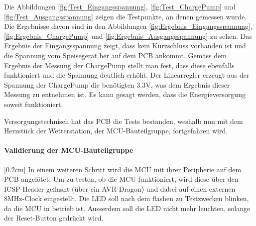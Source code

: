 Die Abbildungen \ref{fig:Test_Eingangsspannung}, \ref{fig:Test_ChargePump} und \ref{fig:Test_Ausgangsspannung} zeigen die Testpunkte, an denen gemessen wurde. Die Ergebnisse davon sind in den Abbildungen \ref{fig:Ergebnis_Eingangsspannung}, \ref{fig:Ergebnis_ChargePump} und \ref{fig:Ergebnis_Ausgangsspannung} zu sehen. Das Ergebnis der Eingangsspannung zeigt, dass kein Kurzschluss vorhanden ist und die Spannung vom Speisegerät her auf dem PCB ankommt. Gemäss dem Ergebnis der Messung der ChargePump stellt man fest, dass diese ebenfalls funktioniert und die Spannung deutlich erhöht. Der Linearregler erzeugt aus der Spannung der ChargePump die benötigten 3.3V, was dem Ergebnis dieser Messung zu entnehmen ist. Es kann gesagt werden, dass die Energieversorgung soweit funktioniert.

Versorgungstechnisch hat das PCB die Tests bestanden, weshalb nun mit dem Herzstück der Wetterstation, der MCU-Bauteilgruppe, fortgefahren wird.

\paragraph{\textbf{Validierung der MCU-Bauteilgruppe}}[0.2cm]
In einem weiteren Schritt wird die MCU mit ihrer Peripherie auf dem PCB angelötet. Um zu testen, ob die MCU funktioniert, wird diese über den ICSP-Header geflasht (über ein AVR-Dragon) und dabei auf einen externen 8MHz-Clock eingestellt. Die LED soll nach dem flashen zu Testzwecken blinken, da die MCU in betrieb ist. Ausserdem soll die LED nicht mehr leuchten, solange der Reset-Button gedrückt wird.

